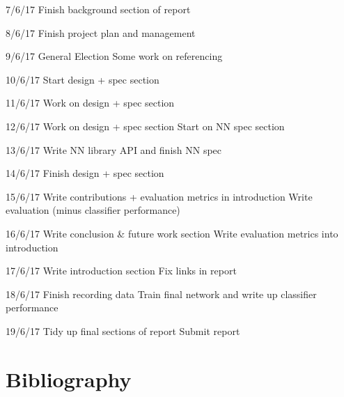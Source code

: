 \documentclass[a4paper]{article}
\begin{document}
7/6/17
    Finish background section of report

8/6/17
    Finish project plan and management

9/6/17
    General Election
    Some work on referencing
    
10/6/17
    Start design + spec section

11/6/17
    Work on design + spec section

12/6/17
    Work on design + spec section
    Start on NN spec section

13/6/17
    Write NN library API and finish NN spec

14/6/17
    Finish design + spec section

15/6/17
    Write contributions + evaluation metrics in introduction
    Write evaluation (minus classifier performance)

16/6/17
    Write conclusion \& future work section
    Write evaluation metrics into introduction

17/6/17
    Write introduction section
    Fix links in report

18/6/17
    Finish recording data
    Train final network and write up classifier performance

19/6/17
    Tidy up final sections of report
    Submit report

\newpage
\section{Bibliography}
\label{sec:bi}
\end{document}
